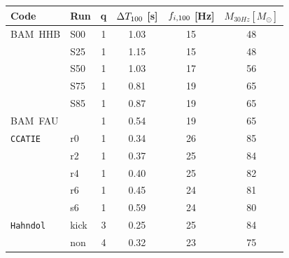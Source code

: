 \begin{table}
\begin{center}
\begin{tabular}{|l|l|c||c|c|c|}\hline
Code & Run & q %
& $\Delta T_{\rm 100}$ [s] & $f_{i,\rm 100}$ [Hz] & $M_{30 Hz} [M_\odot]$ \\ %
 \hline

BAM~HHB    & S00  & 1 %
& 1.03 & 15 & 48  \\ %
            & S25  & 1 %
& 1.15 & 15 & 48  \\ %
            & S50  & 1 %
& 1.03 & 17 & 56  \\ %
            & S75  & 1 %
& 0.81 & 19 & 65  \\ %
            & S85  & 1 %
& 0.87 & 19 & 65  \\ %

BAM~FAU    &      & 1 %
& 0.54 & 19 & 65  \\ %

{\tt CCATIE}& r0   & 1 %
& 0.34 & 26 & 85  \\ %
            & r2   & 1 %
& 0.37 & 25 & 84  \\ %
            & r4   & 1 %
& 0.40 & 25 & 82  \\ %
            & r6   & 1 %
& 0.45 & 24 & 81  \\ %
            & s6   & 1 %
& 0.59 & 24 & 80  \\ %

{\tt Hahndol}&kick & 3 %
& 0.25 & 25 & 84  \\ %
            & non  & 4 %
& 0.32 & 23 & 75  \\ %


\end{tabular}
\end{center}
\end{table}
